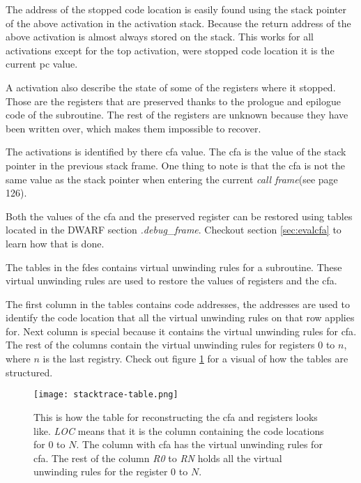 The address of the stopped code location is easily found using the stack pointer of the above activation in the activation stack.
Because the return address of the above activation is almost always stored on the stack.
This works for all activations except for the top activation, were stopped code location it is the current \gls{pc} value.


A activation also describe the state of some of the registers where it stopped.
Those are the registers that are preserved thanks to the prologue and epilogue code of the subroutine.
The rest of the registers are unknown because they have been written over, which makes them impossible to recover.


The activations is identified by there \gls{cfa} value. 
The \gls{cfa} is the value of the stack pointer in the previous stack frame.
One thing to note is that the \gls{cfa} is not the same value as the stack pointer when entering the current \emph{call frame}(see \cite{dwarf} page 126).


Both the values of the \gls{cfa} and the preserved register can be restored using tables located in the \gls{DWARF} section \emph{.debug\_frame}.
Checkout section \ref{sec:evalcfa} to learn how that is done.



 \label{sec:evalcfa}
The tables in the \glspl{fde} contains virtual unwinding rules for a subroutine.
These virtual unwinding rules are used to restore the values of registers and the \gls{cfa}.


The first column in the tables contains code addresses, the addresses are used to identify the code location that all the virtual unwinding rules on that row applies for.
Next column is special because it contains the virtual unwinding rules for \gls{cfa}.
The rest of the columns contain the virtual unwinding rules for registers $0$ to $n$, where $n$ is the last registry.
Check out figure \ref{fig:stacktracetable} for a visual of how the tables are structured.


\begin{figure}[h]
	\centering
	\texttt{[image: stacktrace-table.png]}
	\caption{This is how the table for reconstructing the \gls{cfa} and registers looks like. \emph{LOC} means that it is the column containing the code locations for $0$ to $N$. The column with \gls{cfa} has the virtual unwinding rules for \gls{cfa}. The rest of the column \emph{R0} to \emph{RN} holds all the virtual unwinding rules for the register $0$ to $N$.}
	\label{fig:stacktracetable}
\end{figure}


